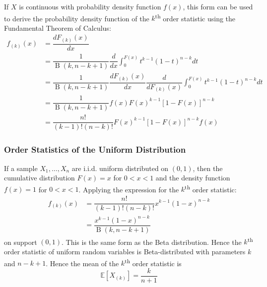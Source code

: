 \documentclass[11pt]{report} %
\begin{document}
If $X$ is continuous with probability density function $f\left(x\right)$, this form can be used to derive the probability density function of the $k$\textsuperscript{th} order statistic using the Fundamental Theorem of Calculus:
\begin{align}
f_{\left(k\right)}\left(x\right) &= \dfrac{dF_{\left(k\right)}\left(x\right)}{dx} \\
&= \dfrac{1}{\operatorname{B}\left(k, n - k + 1\right)}\dfrac{d}{dx}\int_{0}^{F\left(x\right)}t^{k - 1}\left(1 - t\right)^{n - k}dt \\
&= \dfrac{1}{\operatorname{B}\left(k, n - k + 1\right)}\dfrac{dF_{\left(k\right)}\left(x\right)}{dx}\dfrac{d}{dF_{\left(k\right)}\left(x\right)}\int_{0}^{F\left(x\right)}t^{k - 1}\left(1 - t\right)^{n - k}dt \\
&= \dfrac{1}{\operatorname{B}\left(k, n - k + 1\right)}f\left(x\right)F\left(x\right)^{k - 1}\left[1 - F\left(x\right)\right]^{n - k} \\
&= \dfrac{n!}{\left(k - 1\right)!\left(n - k\right)!}F\left(x\right)^{k - 1}\left[1 - F\left(x\right)\right]^{n - k}f\left(x\right)
\end{align}

\subsubsection{Order Statistics of the Uniform Distribution}

If a sample $X_{1}, \dots, X_{n}$ are i.i.d. uniform distributed on $\left(0, 1\right)$, then the cumulative distribution $F\left(x\right) = x$ for $0 < x < 1$ and the density function $f\left(x\right) = 1$ for $0 < x < 1$. Applying the expression for the $k$\textsuperscript{th} order statistic:
\begin{align}
f_{\left(k\right)}\left(x\right) &= \dfrac{n!}{\left(k - 1\right)!\left(n - k\right)!}x^{k - 1}\left(1 - x\right)^{n - k} \\
&= \dfrac{x^{k - 1}\left(1 - x\right)^{n - k}}{\operatorname{B}\left(k, n - k + 1\right)}
\end{align}
on support $\left(0, 1\right)$. This is the same form as the Beta distribution. Hence the $k$\textsuperscript{th} order statistic of uniform random variables is Beta-distributed with parameters $k$ and $n - k + 1$. Hence the mean of the $k$\textsuperscript{th} order statistic is
\begin{equation}
\mathbb{E}\left[X_{\left(k\right)}\right] = \dfrac{k}{n + 1}
\end{equation}
\end{document}
